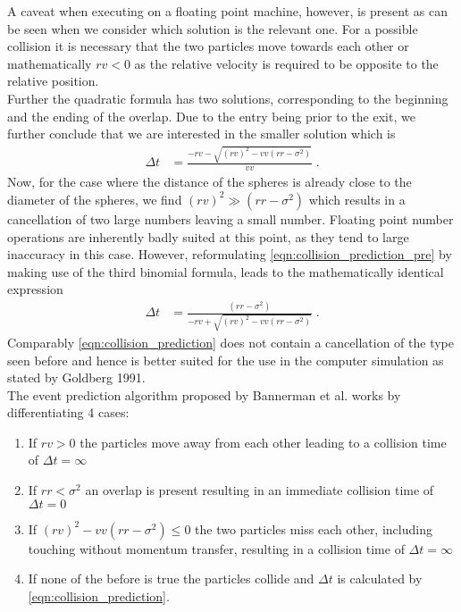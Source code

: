 A caveat when executing on a floating point machine, however, is present as can be seen when we consider which solution is the relevant one. For a possible collision it is necessary that the two particles move towards each other or mathematically $rv<0$ as the relative velocity is required to be opposite to the relative position.\\

Further the quadratic formula has two solutions, corresponding to the beginning and the ending of the overlap. Due to the entry being prior to the exit, we further conclude that we are interested in the smaller solution which is
\begin{align}
\label{eqn:collision_prediction_pre}
\Delta t &= \frac{ - rv - \sqrt{ (rv)^2  - vv (rr - \sigma^2 )} }{vv} \; \text{.}
\end{align}
Now, for the case where the distance of the spheres is already close to the diameter of the spheres, we find $(rv)^2 \gg (rr-\sigma^2)$ which results in a cancellation of two large numbers leaving a small number. Floating point number operations are inherently badly suited at this point, as they tend to large inaccuracy in this case. However, reformulating \autoref{eqn:collision_prediction_pre} by making use of the third binomial formula, leads to the mathematically identical expression
\begin{align}
\label{eqn:collision_prediction}
\Delta t &= \frac{(rr - \sigma^2 )}{ - rv + \sqrt{ (rv)^2  - vv (rr - \sigma^2 )}} \; \text{.}
\end{align}
Comparably \autoref{eqn:collision_prediction} does not contain a cancellation of the type seen before and hence is better suited for the use in the computer simulation as stated by Goldberg 1991\cite{Goldberg1991}.\\

The event prediction algorithm proposed by Bannerman et al.\cite{Bannerman2014} works by differentiating 4 cases:
\begin{enumerate}
\item If $rv>0$ the particles move away from each other leading to a collision time of $\Delta t = \infty$
\item If $rr<\sigma^2$ an overlap is present resulting in an immediate collision time of $\Delta t = 0$
\item If $(rv)^2  - vv (rr - \sigma^2 ) \leq 0 $ the two particles miss each other, including touching without momentum transfer, resulting in a collision time of $\Delta t = \infty$
\item If none of the before is true the particles collide and $\Delta t$ is calculated by \autoref{eqn:collision_prediction}.
\end{enumerate}

